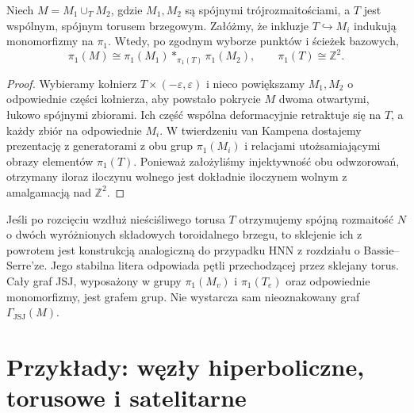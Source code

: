 \begin{stwierdzenie}
Niech $M=M_1\cup_T M_2$, gdzie $M_1,M_2$ są
spójnymi trójrozmaitościami, a $T$ jest wspólnym,
spójnym torusem brzegowym. Załóżmy, że inkluzje
$T\hookrightarrow M_i$ indukują monomorfizmy na
$\pi_1$. Wtedy, po zgodnym wyborze punktów i ścieżek
bazowych,
\[
\pi_1(M)\cong\pi_1(M_1)
 *_{\pi_1(T)}\pi_1(M_2),
\qquad \pi_1(T)\cong\mathbb Z^2.
\]
\end{stwierdzenie}
\begin{proof}
Wybieramy kołnierz $T\times(-\varepsilon,\varepsilon)$
i nieco powiększamy $M_1,M_2$ o odpowiednie części
kołnierza, aby powstało pokrycie $M$ dwoma
otwartymi, łukowo spójnymi zbiorami. Ich część
wspólna deformacyjnie retraktuje się na $T$, a
każdy zbiór na odpowiednie $M_i$. W twierdzeniu
van Kampena dostajemy prezentację z generatorami
z obu grup $\pi_1(M_i)$ i relacjami utożsamiającymi
obrazy elementów $\pi_1(T)$. Ponieważ założyliśmy
injektywność obu odwzorowań, otrzymany iloraz
iloczynu wolnego jest dokładnie iloczynem wolnym
z amalgamacją nad $\mathbb Z^2$.
\end{proof}

\begin{uwaga}
Jeśli po rozcięciu wzdłuż nieściśliwego torusa
$T$ otrzymujemy spójną rozmaitość $N$ o dwóch
wyróżnionych składowych toroidalnego brzegu,
to sklejenie ich z powrotem jest konstrukcją
analogiczną do przypadku HNN z rozdziału o
Bassie--Serre'ze. Jego stabilna litera odpowiada
pętli przechodzącej przez sklejany torus.
Cały graf JSJ, wyposażony w grupy
$\pi_1(M_v)$ i $\pi_1(T_e)$ oraz odpowiednie
monomorfizmy, jest grafem grup. Nie wystarcza
sam nieoznakowany graf $\Gamma_{\mathrm{JSJ}}(M)$.
\end{uwaga}

\section{Przykłady: węzły hiperboliczne, torusowe i satelitarne}
\label{sec:tg-jsj-knots}

